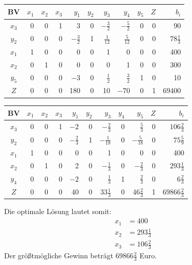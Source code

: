 \begin{center}
  \begin{tabular}{|c|r|r|r|r|r|r|r|r|r|r|}
    \hline
    BV & $x_1$ & $x_2$ & $x_3$ & $y_1$ & $y_2$ & $y_3$ & $y_4$ & $y_5$ & $Z$ & $b_i$\\
    \hline
    $x_3$ & 0 & 0 & 1 & 3 & 0 & $-\tfrac{3}{2}$ & $-\tfrac{5}{2}$ & 0 & 0 & 90\\
    $y_2$ & 0 & 0 & 0 & $-\tfrac{3}{2}$ & 1 & $\tfrac{1}{12}$ & $\tfrac{5}{12}$ & 0 & 0 & $78\tfrac{1}{3}$\\
    $x_1$ & 1 & 0 & 0 & 0 & 0 & 1 & 0 & 0 & 0 & 400\\
    $x_2$ & 0 & 1 & 0 & 0 & 0 & 0 & 1 & 0 & 0 & 300\\
    $y_5$ & 0 & 0 & 0 & $-3$ & 0 & $\tfrac{1}{2}$ & $\boxed{\tfrac{3}{2}}$ & 1 & 0 & 10\\
    $Z$ & 0 & 0 & 0 & 180 & 0 & 10 & $-70$ & 0 & 1 & 69400\\
    \hline
  \end{tabular}
\end{center}

\begin{center}
  \begin{tabular}{|c|r|r|r|r|r|r|r|r|r|r|}
    \hline
    BV & $x_1$ & $x_2$ & $x_3$ & $y_1$ & $y_2$ & $y_3$ & $y_4$ & $y_5$ & $Z$ & $b_i$\\
    \hline
    $x_3$ & 0 & 0 & 1 & $-2$ & 0 & $-\tfrac{2}{3}$ & 0 & $\tfrac{5}{3}$ & 0 & $106\tfrac{2}{3}$\\
    $y_2$ & 0 & 0 & 0 & $-\tfrac{2}{3}$ & 1 & $-\tfrac{1}{18}$ & 0 & $-\tfrac{5}{18}$ & 0 & $75\tfrac{5}{9}$\\
    $x_1$ & 1 & 0 & 0 & 0 & 0 & 1 & 0 & 0 & 0 & 400\\
    $x_2$ & 0 & 1 & 0 & 2 & 0 & $-\tfrac{1}{3}$ & 0 & $-\tfrac{2}{3}$ & 0 & $293\tfrac{1}{3}$\\
    $y_4$ & 0 & 0 & 0 & $-2$ & 0 & $\tfrac{1}{3}$ & 1 & $\tfrac{2}{3}$ & 0 & $6\tfrac{2}{3}$\\
    $Z$ & 0 & 0 & 0 & 40 & 0 & $33\tfrac{1}{3}$ & 0 & $46\tfrac{2}{3}$ & 1 & $69866\tfrac{2}{3}$\\
    \hline
  \end{tabular}
\end{center}

Die optimale Lösung lautet somit:
\begin{align*}
  x_1 &= 400\\
  x_2 &= 293\tfrac{1}{3}\\
  x_3 &= 106\tfrac{2}{3}
\end{align*}
Der größtmögliche Gewinn beträgt $69866\tfrac{2}{3}$ Euro.

